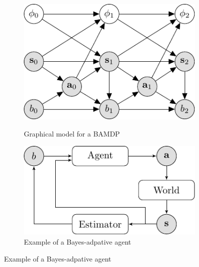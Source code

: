\documentclass{article}
\begin{document}
\begin{figure}[t!]
\centering
\begin{subfigure}[b]{0.45\columnwidth}
\includegraphics[width=1\linewidth]{figs/model.pdf}
\label{fig:pgm}
\caption{Graphical model for a BAMDP}
\end{subfigure}
\begin{subfigure}[b]{0.45\columnwidth}
\includegraphics[width=1\linewidth]{figs/system_structure.pdf}
\caption{Example of a Bayes-adpative agent}
\end{subfigure}
\end{figure}
\end{document}
